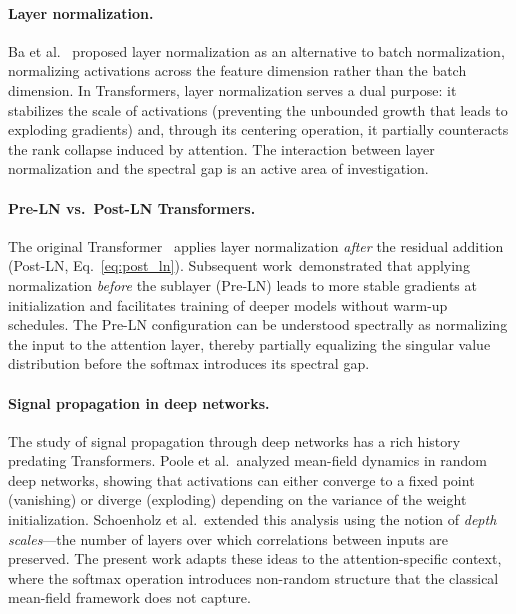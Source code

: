 \documentclass[12pt, a4paper]{article}
\begin{document}
\paragraph{Layer normalization.}
Ba et al.~\cite{ba2016layernorm} proposed layer normalization as an
alternative to batch normalization, normalizing activations across the
feature dimension rather than the batch dimension. In Transformers,
layer normalization serves a dual purpose: it stabilizes the scale of
activations (preventing the unbounded growth that leads to exploding
gradients) and, through its centering operation, it partially
counteracts the rank collapse induced by attention. The interaction
between layer normalization and the spectral gap is an active area of
investigation.

\paragraph{Pre-LN vs.\ Post-LN Transformers.}
The original Transformer~\cite{vaswani2017} applies layer normalization
\textit{after} the residual addition (Post-LN, Eq.~\ref{eq:post_ln}).
Subsequent work~demonstrated that applying normalization
\textit{before} the sublayer (Pre-LN) leads to more stable gradients at
initialization and facilitates training of deeper models without warm-up
schedules. The Pre-LN configuration can be understood spectrally as
normalizing the input to the attention layer, thereby partially
equalizing the singular value distribution before the softmax introduces
its spectral gap.

\paragraph{Signal propagation in deep networks.}
The study of signal propagation through deep networks has a rich history
predating Transformers. Poole et al.\ analyzed mean-field dynamics in
random deep networks, showing that activations can either converge to a
fixed point (vanishing) or diverge (exploding) depending on the
variance of the weight initialization. Schoenholz et al.\ extended
this analysis using the notion of \textit{depth scales}---the number of
layers over which correlations between inputs are preserved. The present
work adapts these ideas to the attention-specific context, where the
softmax operation introduces non-random structure that the classical
mean-field framework does not capture.
\end{document}
